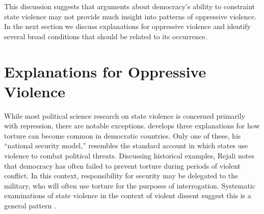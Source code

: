 \documentclass[11pt]{article}
\begin{document}
This discussion suggests that arguments about democracy's ability to constraint state violence may not provide much insight into patterns of oppressive violence. In the next section we discuss explanations for oppressive violence and identify several broad conditions that should be related to its occurrence. 




\section*{Explanations for Oppressive Violence}

While most political science research on state violence is concerned primarily with repression, there are notable exceptions. \citet{Rejali2007} develops three explanations for how torture can become common in democratic countries. Only one of these, his ``national security model,'' resembles the standard account in which states use violence to combat political threats. Discussing historical examples, Rejali notes that democracy has often failed to prevent torture during periods of violent conflict. In this context, responsibility for security may be delegated to the military, who will often use torture for the purposes of interrogation. Systematic examinations of state violence in the context of violent dissent suggest this is a general pattern \citep{Davenport2007,Davenport2007AR,DavenportMooreArmstrong2007,ConradMoore2010}. 
\end{document}
